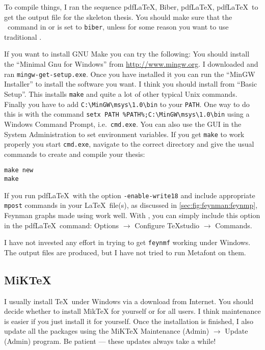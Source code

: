 To compile things, I ran the sequence pdf\LaTeX, Biber, pdf\LaTeX,
pdf\LaTeX\ to get the output file for the skeleton thesis.
You should make sure that the \BibTeX\ command in \TeXstudio or \TeXworks
is set to \texttt{biber},
unless for some reason you want to use traditional \BibTeX.

If you want to install GNU Make you can try the following:
You should install the \enquote{Minimal Gnu for Windows} from \url{http://www.mingw.org}.
I downloaded and ran \texttt{mingw-get-setup.exe}.
Once you have installed it you can run the \enquote{MinGW Installer} to install the software you want.
I think you should install  from \enquote{Basic Setup}.
This installs \texttt{make} and quite a lot of other typical Unix commands.
Finally you have to add \verb|C:\MinGW\msys\1.0\bin| to your \texttt{PATH}.
One way to do this is with the command \verb|setx PATH %PATH%;C:\MinGW\msys\1.0\bin| using a Windows Command Prompt, 
i.e.\ \texttt{cmd.exe}.
You can also use the GUI in the System Administration to set environment variables.
If you get \texttt{make} to work properly you start \texttt{cmd.exe},
navigate to the correct directory and give the usual commands to create and compile your thesis:
\begin{verbatim}
make new
make
\end{verbatim}

If you run pdf\LaTeX\ with the option \texttt{-enable-write18} and
include appropriate \texttt{mpost} commands in your \LaTeX\ file(s), %
as discussed in \cref{sec:fig:feynman:feynmp}, Feynman graphs made
using  work well.
With \TeXstudio, you can simply
include this option in the pdf\LaTeX\ command: \textsf{Options} $\to$
\textsf{Configure TeXstudio} $\to$ \textsf{Commands}.

I have not invested any effort in trying to get \texttt{feynmf}
working under Windows. The output files are produced, but I have not
tried to run Metafont on them.


\subsection{MiK\TeX}%
\label{sec:app:miktex}

I usually install \TeX\ under Windows via a download from Internet.
You should decide whether to install Mik\TeX{} for yourself or for all users.
I think maintenance is easier if you just install it for yourself.
Once the installation is finished, I also update all the
packages using the MiK\TeX{} Maintenance (Admin) $\to$ Update (Admin) program.
Be patient --- these updates always take a while!

